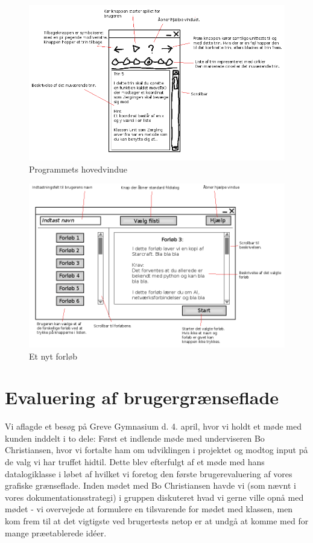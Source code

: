\documentclass[10pt,a4paper,danish]{article}
\begin{document}
\begin{figure}[h]
  \begin{center}
    \includegraphics[scale=0.4]{hovedvindue.png}
    \caption{Programmets hovedvindue}
    \label{fig:hovedvindue}
  \end{center}
\end{figure}
\newpage

\begin{figure}[h]
  \begin{center}
    \includegraphics[scale=0.4]{nytforloeb.png}
    \caption{Et nyt forløb}
    \label{fig:nytforloeb}
  \end{center}
\end{figure}
\newpage


\section{Evaluering af brugergrænseflade}
Vi aflagde et besøg på Greve Gymnasium d. 4. april, hvor vi holdt et møde med kunden inddelt i to dele: Først et indlende møde med underviseren Bo Christiansen, hvor vi fortalte ham om udviklingen i projektet og modtog input på de valg vi har truffet hidtil. Dette blev efterfulgt af et møde med hans datalogiklasse i løbet af hvilket vi foretog den første brugerevaluering af vores grafiske grænseflade. Inden mødet med Bo Christiansen havde vi (som nævnt i vores dokumentationsstrategi) i gruppen diskuteret hvad vi gerne ville opnå med mødet - vi overvejede at formulere en tilsvarende for mødet med klassen, men kom frem til at det vigtigste ved brugertests netop er at undgå at komme med for mange præetablerede idéer.
\end{document}

